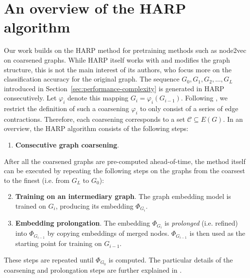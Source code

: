 \section{An overview of the HARP algorithm}\label{sec:harp}

Our work builds on the HARP method \cite{chen_harp_2018} for pretraining methods such as node2vec \cite{grover_node2vec_2016} on coarsened graphs. While HARP itself works with and modifies the graph structure, this is not the main interest of its authors, who focus more on the classification accuracy for the original graph. The sequence \( G_0, G_1, G_2, \dots, G_L \) introduced in Section~\ref{sec:performance-complexity} is generated in HARP consecutively. Let \( \varphi_i \) denote this mapping \( G_i = \varphi_i \left( G_{i - 1} \right) \). Following \cite{schulz_mining_2019}, we restrict the definition of such a coarsening \( \varphi_i \) to only consist of a series of edge contractions. Therefore, each coarsening corresponds to a set \( \mathcal{C} \subseteq E \left( G \right) \). In an overview, the HARP algorithm consists of the following steps:

\begin{enumerate}
  \item \textbf{Consecutive graph coarsening}.
\end{enumerate}
After all the coarsened graphs are pre-computed ahead-of-time, the method itself can be executed by repeating the following steps on the graphs from the coarsest to the finest (i.e. from \( G_L \) to \( G_0 \)):
\begin{enumerate}\setcounter{enumi}{1}
  \item \textbf{Training on an intermediary graph}. The graph embedding model is trained on \( G_i \), producing its embedding \( \Phi_{G_i} \).
  \item \textbf{Embedding prolongation}. The embedding \( \Phi_{G_i} \) is \textit{prolonged} (i.e. refined) into \( \Phi_{G_{i - 1}} \) by copying embeddings of merged nodes. \( \Phi_{G_{i - 1}} \) is then used as the starting point for training on \( G_{i - 1} \).
\end{enumerate}
These steps are repeated until \( \Phi_{G_0} \) is computed. The particular details of the coarsening and prolongation steps are further explained in \cite{chen_harp_2018}.

